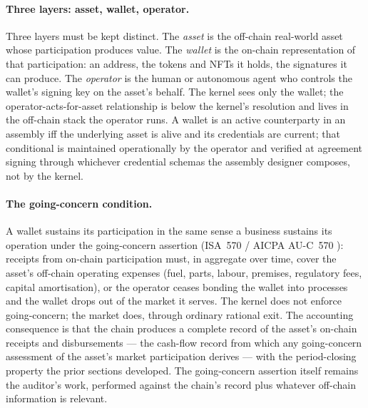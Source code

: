\documentclass[11pt,a4paper]{article}
\theoremstyle{definition}
\theoremstyle{remark}
\begin{document}
\paragraph{Three layers: asset, wallet, operator.}
Three layers must be kept distinct. The \emph{asset} is the
off-chain real-world asset whose participation produces value.
The \emph{wallet} is the on-chain representation of that
participation: an address, the tokens and NFTs it holds, the
signatures it can produce. The \emph{operator} is the human or
autonomous agent who controls the wallet's signing key on the
asset's behalf. The kernel sees only the wallet; the
operator-acts-for-asset relationship is below the kernel's
resolution and lives in the off-chain stack the operator runs.
A wallet is an active counterparty in an assembly iff the
underlying asset is alive and its credentials are current; that
conditional is maintained operationally by the operator and
verified at agreement signing through whichever credential
schemas the assembly designer composes, not by the kernel.

\paragraph{The going-concern condition.}
A wallet sustains its participation in the same sense a
business sustains its operation under the going-concern
assertion (ISA~570 / AICPA AU-C~570
\citep{aicpa2020auc570}): receipts from on-chain participation
must, in aggregate over time, cover the asset's off-chain
operating expenses (fuel, parts, labour, premises, regulatory
fees, capital amortisation), or the operator ceases bonding
the wallet into processes and the wallet drops out of the
market it serves. The kernel does not enforce going-concern;
the market does, through ordinary rational exit. The
accounting consequence is that the chain produces a complete
record of the asset's on-chain receipts and disbursements ---
the cash-flow record from which any going-concern assessment
of the asset's market participation derives --- with the
period-closing property the prior sections developed. The
going-concern assertion itself remains the auditor's work,
performed against the chain's record plus whatever off-chain
information is relevant.
\end{document}
